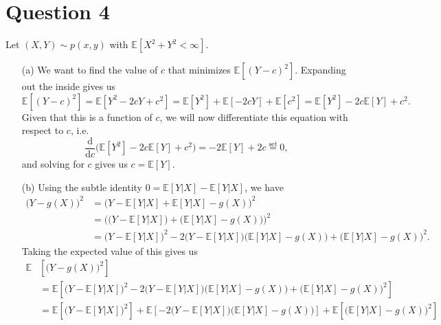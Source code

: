\documentclass[10pt]{article}
\begin{document}
\section{Question 4} \noindent
Let \((X,Y)\sim p(x,y)\) with \(\mathbb{E}[X^2 + Y^2 < \infty]\).
\begin{itemize}
    \item[(a)] We want to find the value of \(c\) that minimizes \(\mathbb{E}\left[ (Y - c)^2\right]\). Expanding out the inside gives us 
    \[
        \mathbb{E} \left[ (Y - c)^2\right] = \mathbb{E} \left[Y^2 - 2cY + c^2\right]
        = \mathbb{E} \left[Y^2\right] + \mathbb{E} \left[-2cY\right] + \mathbb{E} \left[c^2\right] 
        = \mathbb{E} \left[Y^2\right] - 2c \mathbb{E} \left[Y\right] + c^2.
    \]
    Given that this is a function of \(c\), we will now differentiate this equation with respect to \(c\), i.e. 
    \[
        \frac{\mathrm{d}}{\mathrm{d}c} \Big( \mathbb{E} \left[Y^2\right] - 2c \mathbb{E} \left[Y\right] + c^2 \Big)
        = -2 \mathbb{E}[Y] + 2c \overset{\text{set}}{=} 0,
    \]
    and solving for \(c\) gives us \(c = \mathbb{E}[Y]\).
    \item[(b)] Using the subtle identity \(0 = \mathbb{E}[Y|X] - \mathbb{E}[Y|X]\), we have 
    \begin{align*}
        \big( Y - g(X)\big)^2 &= \big( Y - \mathbb{E}[Y|X] + \mathbb{E}[Y|X] - g(X)\big)^2 \\
        &= \Big( \big( Y - \mathbb{E}[Y|X] \big) + \big( \mathbb{E}[Y|X] - g(X) \big) \Big)^2 \\
        &= \big( Y - \mathbb{E}[Y|X] \big)^2 - 2 \big( Y - \mathbb{E}[Y|X] \big) \big( \mathbb{E}[Y|X] - g(X) \big)
        + \big( \mathbb{E}[Y|X] - g(X) \big)^2.
    \end{align*}
    Taking the expected value of this gives us 
    \begin{align*}
        \mathbb{E}&\left[ \big( Y - g(X)\big)^2 \right] \\
        &= \mathbb{E} \left[ 
            \big( Y - \mathbb{E}[Y|X] \big)^2 - 2 \big( Y - \mathbb{E}[Y|X] \big) \big( \mathbb{E}[Y|X] - g(X) \big)
            + \big( \mathbb{E}[Y|X] - g(X) \big)^2
         \right] \\
        &= \mathbb{E}\left[ \big( Y - \mathbb{E}[Y|X] \big)^2 \right]
            + \mathbb{E}\left[ - 2 \big( Y - \mathbb{E}[Y|X] \big) \big( \mathbb{E}[Y|X] - g(X) \big) \right] 
            + \mathbb{E}\left[ \big( \mathbb{E}[Y|X] - g(X) \big)^2 \right]
    \end{align*}
\end{itemize}
\end{document}
